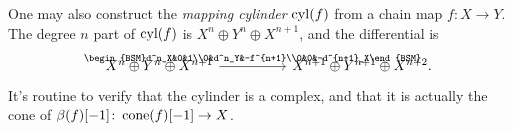 One may also construct the \emph{mapping cylinder} $\operatorname{cyl}(f)$ from a chain map $f\colon X\to Y$. The degree $n$ part of $\operatorname{cyl}(f)$ is $X^n\oplus Y^n\oplus X^{n+1}$, and the differential is
\begin{equation*}
  \begin{tikzcd}[ampersand replacement=\&,column sep=huge,]
    X^n\oplus Y^n\oplus X^{n+1} \& X^{n+1}\oplus Y^{n+1}\oplus X^{n+2}.
    \arrow[from=1-1,]{1-2}[]{\begin{BSM}d^n_X&0&1\\0&d^n_Y&-f^{n+1}\\0&0&-d^{n+1}_X\end{BSM}}
  \end{tikzcd}
\end{equation*}
It's routine to verify that the cylinder is a complex, and that it is actually the cone of $\beta(f)[-1]\colon \operatorname{cone}(f)[-1]\to X$.

